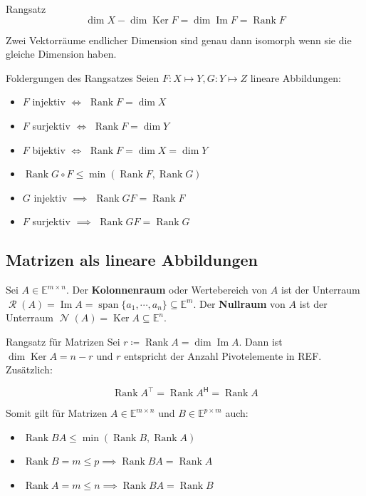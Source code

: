 \documentclass[a4paper,10pt]{article}
\DeclareMathOperator{\Rank}{Rank}
\DeclareMathOperator{\Image}{Im}
\DeclareMathOperator{\Columnspace}{\mathcal{R}}
\DeclareMathOperator{\Nullspace}{\mathcal{N}}
\DeclareMathOperator{\Kernel}{Ker}
\DeclareMathOperator{\Span}{span}
\newcommand*{\hermconj}{\mathsf{H}}
\def\E{\mathbb{E}}
\begin{document}
\begin{mainbox}{Rangsatz}
  $$\dim X - \dim \Kernel F = \dim \Image F = \Rank F$$
\end{mainbox}

Zwei Vektorräume endlicher Dimension sind genau dann isomorph wenn sie die gleiche Dimension haben.

\begin{subbox}{Foldergungen des Rangsatzes}
  Seien $F: X \mapsto Y, G: Y \mapsto Z$ lineare Abbildungen:
  \begin{itemize}
    \item $F$ injektiv $\iff$ $\Rank F = \dim X$
    \item $F$ surjektiv $\iff$ $\Rank F = \dim Y$
    \item $F$ bijektiv $\iff$ $\Rank F = \dim X = \dim Y$
    \item $\Rank G \circ F \leq \min(\Rank F, \Rank G)$
    \item $G$ injektiv $\implies$ $\Rank GF = \Rank F$
    \item $F$ surjektiv $\implies$ $\Rank GF = \Rank G$
  \end{itemize}
\end{subbox}

\subsection{Matrizen als lineare Abbildungen}

Sei $A \in \E^{m \times n}$. Der \textbf{Kolonnenraum} oder Wertebereich von $A$ ist der Unterraum $\Columnspace(A) = \Image A = \Span \{ a_1, \cdots, a_n \} \subseteq \E^m$. Der \textbf{Nullraum} von $A$ ist der Unterraum $\Nullspace(A) = \Kernel A \subseteq \E^n$.


\begin{subbox}{Rangsatz für Matrizen}
  Sei $r \coloneqq \Rank A = \dim \Image A$. Dann ist $\dim \Kernel A = n - r$ und $r$ entspricht der Anzahl Pivotelemente in REF. Zusätzlich:
  
  $$\Rank A^\top = \Rank A^\hermconj = \Rank A$$
\end{subbox}

Somit gilt für Matrizen $A \in \E^{m \times n}$ und $B \in \E^{p \times m}$ auch:

\begin{itemize}
  \item $\Rank BA \leq \min(\Rank B, \Rank A)$
  \item $\Rank B = m \leq p \implies \Rank BA = \Rank A$
  \item $\Rank A = m \leq n \implies \Rank BA = \Rank B$
\end{itemize}
\end{document}
